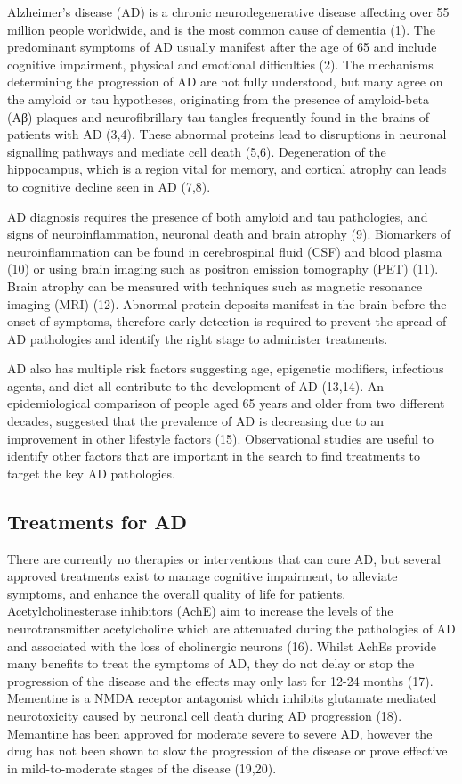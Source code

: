 \documentclass[
  a4paper,
]{article}
\begin{document}
Alzheimer's disease (AD) is a chronic neurodegenerative disease
affecting over 55 million people worldwide, and is the most common cause
of dementia (1). The predominant symptoms of AD usually manifest after
the age of 65 and include cognitive impairment, physical and emotional
difficulties (2). The mechanisms determining the progression of AD are
not fully understood, but many agree on the amyloid or tau hypotheses,
originating from the presence of amyloid-beta (Aβ) plaques and
neurofibrillary tau tangles frequently found in the brains of patients
with AD (3,4). These abnormal proteins lead to disruptions in neuronal
signalling pathways and mediate cell death (5,6). Degeneration of the
hippocampus, which is a region vital for memory, and cortical atrophy
can leads to cognitive decline seen in AD (7,8).

AD diagnosis requires the presence of both amyloid and tau pathologies,
and signs of neuroinflammation, neuronal death and brain atrophy (9).
Biomarkers of neuroinflammation can be found in cerebrospinal fluid
(CSF) and blood plasma (10) or using brain imaging such as positron
emission tomography (PET) (11). Brain atrophy can be measured with
techniques such as magnetic resonance imaging (MRI) (12). Abnormal
protein deposits manifest in the brain before the onset of symptoms,
therefore early detection is required to prevent the spread of AD
pathologies and identify the right stage to administer treatments.

AD also has multiple risk factors suggesting age, epigenetic modifiers,
infectious agents, and diet all contribute to the development of AD
(13,14). An epidemiological comparison of people aged 65 years and older
from two different decades, suggested that the prevalence of AD is
decreasing due to an improvement in other lifestyle factors (15).
Observational studies are useful to identify other factors that are
important in the search to find treatments to target the key AD
pathologies.

\hypertarget{treatments-for-ad}{%
\subsection{Treatments for AD}\label{treatments-for-ad}}

There are currently no therapies or interventions that can cure AD, but
several approved treatments exist to manage cognitive impairment, to
alleviate symptoms, and enhance the overall quality of life for
patients. Acetylcholinesterase inhibitors (AchE) aim to increase the
levels of the neurotransmitter acetylcholine which are attenuated during
the pathologies of AD and associated with the loss of cholinergic
neurons (16). Whilst AchEs provide many benefits to treat the symptoms
of AD, they do not delay or stop the progression of the disease and the
effects may only last for 12-24 months (17). Mementine is a NMDA
receptor antagonist which inhibits glutamate mediated neurotoxicity
caused by neuronal cell death during AD progression (18). Memantine has
been approved for moderate severe to severe AD, however the drug has not
been shown to slow the progression of the disease or prove effective in
mild-to-moderate stages of the disease (19,20).
\end{document}
